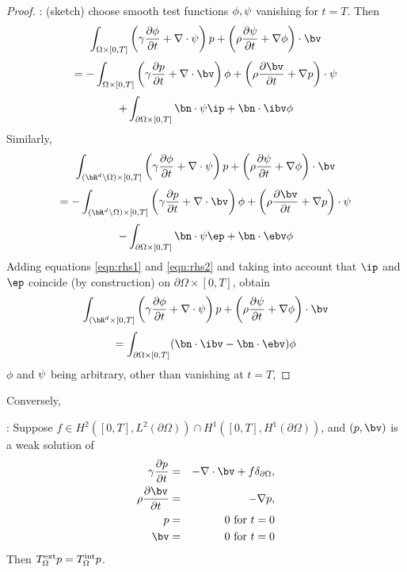 \begin{proof}: (sketch) choose smooth test functions $\phi, {\bf \psi}$ vanishing for $t=T$. Then
\[
\int_{\Omega \times [0,T]}\left (\gamma \frac{\partial \phi}{\partial t} +
\nabla \cdot {\bf \psi}\right)p + \left(\rho\frac{\partial {\bf
    \psi}}{\partial t}
  + \nabla \phi\right) \cdot \bv
\]
\[
= - \int_{\Omega \times [0,T]}\left (\gamma \frac{\partial p}{\partial t} +
\nabla \cdot \bv\right) \phi + \left(\rho\frac{\partial \bv}{\partial t}
  + \nabla p\right) \cdot {\bf \psi}
\]
\begin{equation}
\label{eqn:rhs1}
+ \int_{\partial \Omega \times [0,T]} \bn \cdot {\bf \psi} \ip + \bn
  \cdot \ibv \phi
\end{equation}
Similarly,
\[
\int_{(\bR^d\setminus \Omega) \times [0,T]}\left (\gamma \frac{\partial \phi}{\partial t} +
\nabla \cdot {\bf \psi}\right)p + \left(\rho\frac{\partial {\bf
    \psi}}{\partial t}
  + \nabla \phi\right) \cdot \bv
\]
\[
= - \int_{(\bR^d \setminus\Omega) \times [0,T]}\left (\gamma \frac{\partial p}{\partial t} +
\nabla \cdot \bv\right) \phi + \left(\rho\frac{\partial \bv}{\partial t}
  + \nabla p\right) \cdot {\bf \psi}
\]
\begin{equation}
\label{eqn:rhs2}
- \int_{\partial \Omega \times [0,T]} \bn \cdot {\bf \psi} \ep + \bn
  \cdot \ebv \phi
\end{equation}
Adding equations \ref{eqn:rhs1} and \ref{eqn:rhs2} and taking into
account that $\ip$ and $\ep$ coincide (by construction) on $\partial
\Omega \times [0,T]$, obtain
\[
\int_{(\bR^d \times [0,T]}\left (\gamma \frac{\partial \phi}{\partial t} +
\nabla \cdot {\bf \psi}\right)p + \left(\rho\frac{\partial {\bf
    \psi}}{\partial t}
  + \nabla \phi\right) \cdot \bv
\]
\[
= \int_{\partial \Omega \times [0,T]} (\bn \cdot \ibv -  \bn
  \cdot \ebv) \phi
\]
$\phi$ and ${\bf \psi}$ being arbitrary, other than vanishing at $t=T$,
\end{proof}

Conversely,
\begin{thm}: Suppose $f \in  H^2([0,T],L^2(\partial \Omega)) \cap
  H^1([0,T],H^1(\partial \Omega))$, and $(p,\bv)$ is a weak solution of
\begin{eqnarray}
\label{eqn:awe2}
\gamma \frac{\partial p}{\partial t} & = & - \nabla \cdot \bv +
f \delta_{\partial \Omega}, \nonumber \\
\rho \frac{\partial \bv}{\partial t} & = & - \nabla p,\nonumber \\
p & =& 0 \mbox{ for } t= 0\nonumber\\ 
\bv & = & 0 \mbox{ for } t= 0
\end{eqnarray}
Then $T^{\rm ext}_{\Omega} p = T^{\rm int}_{\Omega}p$.
\end{thm}

